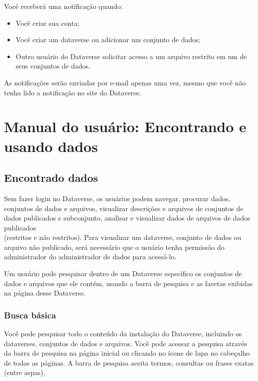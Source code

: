 \documentclass[12pt,hidelinks]{article}
\begin{document}
Você receberá uma notificação quando:

\begin{itemize} 
\item Você criar sua conta;
\item Você criar um dataverse ou adicionar um conjunto de dados;
\item Outro usuário do Dataverse solicitar acesso a um arquivo restrito em um de seus conjuntos de dados.
\end{itemize}	

As notificações serão enviadas por e-mail apenas uma vez, mesmo que você não tenha lido a notificação no site do Dataverse.

\newpage
     	
\section{Manual do usuário: Encontrando e usando dados}
\vspace{10.5cm}

	\subsection{Encontrado dados}
	
\qquad Sem fazer login no Dataverse, os usuários podem navegar, procurar dados, conjuntos de dados e arquivos, visualizar descrições e arquivos de conjuntos de dados publicados e subconjunto, analisar e visualizar dados de arquivos de dados publicados \\(restritos e não restritos). Para visualizar um dataverse, conjunto de dados ou arquivo não publicado, será necessário que o usuário tenha permissão do administrador do administrador de dados para acessá-lo.

Um usuário pode pesquisar dentro de um Dataverse específico os conjuntos de dados e arquivos que ele contém, usando a barra de pesquisa e as facetas exibidas na página desse Dataverse.
	
	    \subsubsection{Busca básica}
	    
\qquad Você pode pesquisar todo o conteúdo da instalação do Dataverse, incluindo os dataverses, conjuntos de dados e arquivos. Você pode acessar a pesquisa através da barra de pesquisa na página inicial ou clicando no ícone de lupa no cabeçalho de todas as páginas. A barra de pesquisa aceita termos, consultas ou frases exatas (entre aspas).\\
	    
\end{document}
